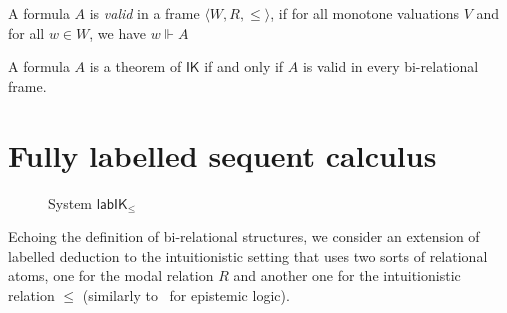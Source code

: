 \documentclass[twoside]{aiml20}
\newcommand*{\rel}{R}
\newcommand*{\IK}{\mathsf{IK}}
\newcommand*{\lab}{\mathsf{lab}}
\newcommand*{\labIKp}{\lab\IK_{\le}}
\newcommand*{\lb}[1]{#1}%
\newcommand*{\fm}[1]{#1}%
\newcommand{\SEQ}{\Rightarrow}
\newcommand{\B}{\mathcal{B}}
\newcommand{\Left}{\mathcal{L}}
\newcommand*{\labels}[2]{\lb{#1}\mathord{:}\fm{#2}}
\begin{document}
\begin{definition}
	A formula $\fm A$ is \emph{valid} in a frame $\langle W, R, \le \rangle$, if for all monotone valuations $V$ and for all $\lb w \in W$, we have $\lb w \Vdash \fm A$
\end{definition}


\begin{theorem}\label{thm:plotkin}
	A formula $\fm A$ is a theorem of $\IK$ if and only if $\fm A$ is valid in every bi-relational frame.
\end{theorem}

\section{Fully labelled sequent calculus}\label{sec:labelled}

\begin{figure}
	\centering
	\caption{System $\labIKp$}
	\label{fig:labIK}
\end{figure}


%
%
%
Echoing the definition of bi-relational structures, we consider an extension of labelled deduction to the intuitionistic setting
%
that uses two sorts of relational atoms, one for the modal relation $\rel$ and another one for the intuitionistic relation $\leq$ (similarly to~\cite{maffezioli2013} for epistemic logic). 
%
\end{document}
